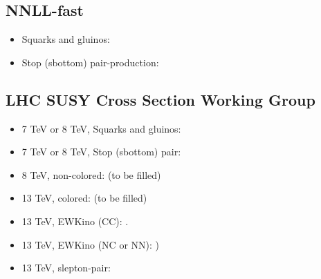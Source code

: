 \documentclass{article}
\begin{document}
\subsection*{NNLL-fast}
\begin{itemize}
 \item Squarks and gluinos:\cite{NNLLfastWeb,Beenakker:2016lwe,Beenakker:1996ch,Kulesza:2008jb,Kulesza:2009kq,Beenakker:2009ha,Beenakker:2011sf,Beenakker:2013mva,Beenakker:2014sma}
 \item Stop (sbottom) pair-production: \cite{NNLLfastWeb,Beenakker:2016lwe,Beenakker:1997ut,Beenakker:2010nq,Beenakker:2016gmf}
\end{itemize}


\subsection*{LHC SUSY Cross Section Working Group}
\begin{itemize}
 \item 7 TeV or 8 TeV, Squarks and gluinos:
       \cite{Kramer:2012bx,LHCSUSYCSWG,NLLfastWeb,Beenakker:1996ch,Kulesza:2008jb,Kulesza:2009kq,Beenakker:2009ha,Beenakker:2011fu}
 \item 7 TeV or 8 TeV, Stop (sbottom) pair:
       \cite{Kramer:2012bx,LHCSUSYCSWG,NLLfastWeb,Beenakker:1997ut,Beenakker:2010nq,Beenakker:2011fu}
 \item 8 TeV, non-colored: (to be filled)
 \item 13 TeV, colored: (to be filled)
 \item 13 TeV, EWKino (CC): \cite{Beenakker:1999xh,Debove:2010kf,Fuks:2012qx,Fuks:2013vua}.
 \item 13 TeV, EWKino (NC or NN): \cite{Beenakker:1999xh,Debove:2010kf,Fuks:2012qx,Fuks:2013vua,Fiaschi:2018hgm})
 \item 13 TeV, slepton-pair: \cite{Beenakker:1999xh,Bozzi:2007qr,Fuks:2013vua,Fuks:2013lya,Fiaschi:2018xdm}
\end{itemize}


{\footnotesize }
\end{document}
